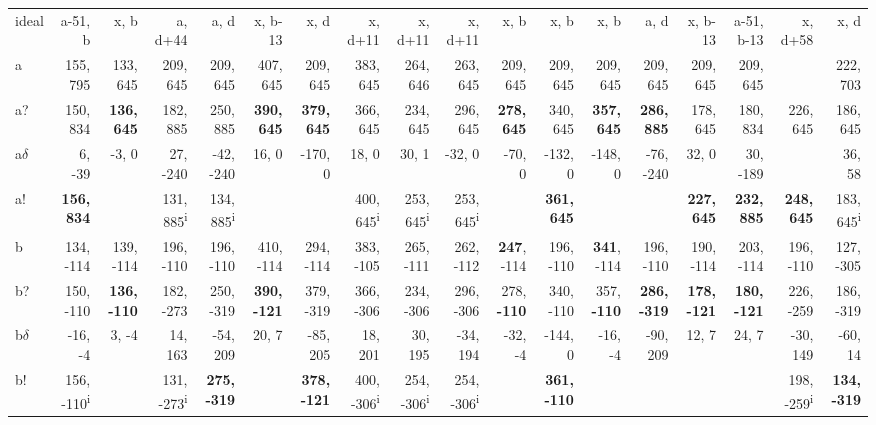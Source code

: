 \begin{table}[p]
{\begin{tabular}{lrrrrrrrrrrrrrrrrr}
ideal & a-51, b & x, b & a, d+44 & a, d & x, b-13 & x, d & x, d+11 & x, d+11 & x, d+11 & x, b & x, b & x, b & a, d & x, b-13 & a-51, b-13 & x, d+58 & x, d \\
a & 155, 795 & 133, 645 & 209, 645 & 209, 645 & 407, 645 & 209, 645 & 383, 645 & 264, 646 & 263, 645 & 209, 645 & 209, 645 & 209, 645 & 209, 645 & 209, 645 & 209, 645 &  & 222, 703 \\
a? & 150, 834 & \textbf{136, 645} & 182, 885 & 250, 885 & \textbf{390, 645} & \textbf{379, 645} & 366, 645 & 234, 645 & 296, 645 & \textbf{278, 645} & 340, 645 & \textbf{357, 645} & \textbf{286, 885} & 178, 645 & 180, 834 & 226, 645 & 186, 645 \\
a$\delta$ & 6, -39 & -3, 0 & 27, -240 & -42, -240 & 16, 0 & -170, 0 & 18, 0 & 30, 1 & -32, 0 & -70, 0 & -132, 0 & -148, 0 & -76, -240 & 32, 0 & 30, -189 &  & 36, 58 \\
a! & \textbf{156, 834} &  & 131, 885\textsuperscript{i} & 134, 885\textsuperscript{i} &  &  & 400, 645\textsuperscript{i} & 253, 645\textsuperscript{i} & 253, 645\textsuperscript{i} &  & \textbf{361, 645} &  &  & \textbf{227, 645} & \textbf{232, 885} & \textbf{248, 645} & 183, 645\textsuperscript{i} \\
b & 134, -114 & 139, -114 & 196, -110 & 196, -110 & 410, -114 & 294, -114 & 383, -105 & 265, -111 & 262, -112 & \textbf{247}, -114 & 196, -110 & \textbf{341}, -114 & 196, -110 & 190, -114 & 203, -114 & 196, -110 & 127, -305 \\
b? & 150, -110 & \textbf{136, -110} & 182, -273 & 250, -319 & \textbf{390, -121} & 379, -319 & 366, -306 & 234, -306 & 296, -306 & 278, \textbf{-110} & 340, -110 & 357, \textbf{-110} & \textbf{286, -319} & \textbf{178, -121} & \textbf{180, -121} & 226, -259 & 186, -319 \\
b$\delta$ & -16, -4 & 3, -4 & 14, 163 & -54, 209 & 20, 7 & -85, 205 & 18, 201 & 30, 195 & -34, 194 & -32, -4 & -144, 0 & -16, -4 & -90, 209 & 12, 7 & 24, 7 & -30, 149 & -60, 14 \\
b! & 156, -110\textsuperscript{i} &  & 131, -273\textsuperscript{i} & \textbf{275, -319} &  & \textbf{378, -121} & 400, -306\textsuperscript{i} & 254, -306\textsuperscript{i} & 254, -306\textsuperscript{i} &  & \textbf{361, -110} &  &  &  &  & 198, -259\textsuperscript{i} & \textbf{134, -319} \\

\end{tabular}}
\end{table}
